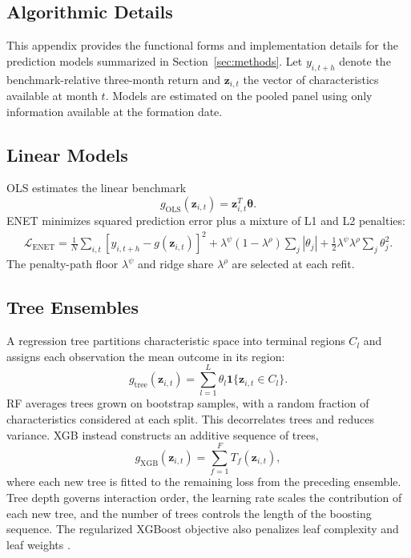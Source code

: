 \documentclass[preprint,12pt,authoryear]{elsarticle}
\begin{document}
\begin{appendices}
\subsection{Algorithmic Details}\label{app:algorithmic}

This appendix provides the functional forms and implementation details for the prediction models summarized in Section~\ref{sec:methods}. Let $y_{i,t+h}$ denote the benchmark-relative three-month return and $\mathbf{z}_{i,t}$ the vector of characteristics available at month $t$. Models are estimated on the pooled panel using only information available at the formation date.

\subsection{Linear Models}

OLS estimates the linear benchmark
\begin{equation}
g_{\mathrm{OLS}}(\mathbf{z}_{i,t})=\mathbf{z}_{i,t}^{T}\boldsymbol{\theta}.
\end{equation}
ENET minimizes squared prediction error plus a mixture of L1 and L2 penalties:
\begin{multline}
\label{elasticeq}
\mathcal{L}_{\mathrm{ENET}}=
\frac{1}{N}\sum_{i,t}\left[y_{i,t+h}-g(\mathbf{z}_{i,t})\right]^2+
\lambda^{\psi}(1-\lambda^{\rho})\sum_j|\theta_j|+
\frac{1}{2}\lambda^{\psi}\lambda^{\rho}\sum_j\theta_j^2.
\end{multline}
The penalty-path floor $\lambda^{\psi}$ and ridge share $\lambda^{\rho}$ are selected at each refit.

\subsection{Tree Ensembles}

A regression tree partitions characteristic space into terminal regions $C_l$ and assigns each observation the mean outcome in its region:
\begin{equation}
g_{\mathrm{tree}}(\mathbf{z}_{i,t})=
\sum_{l=1}^{L}\theta_l\mathbf{1}\{\mathbf{z}_{i,t}\in C_l\}.
\end{equation}
RF averages trees grown on bootstrap samples, with a random fraction of characteristics considered at each split. This decorrelates trees and reduces variance. XGB instead constructs an additive sequence of trees,
\begin{equation}
\label{objxgb}
g_{\mathrm{XGB}}(\mathbf{z}_{i,t})=\sum_{f=1}^{F}T_f(\mathbf{z}_{i,t}),
\end{equation}
where each new tree is fitted to the remaining loss from the preceding ensemble. Tree depth governs interaction order, the learning rate scales the contribution of each new tree, and the number of trees controls the length of the boosting sequence. The regularized XGBoost objective also penalizes leaf complexity and leaf weights \citep{chenguestrin2016}.


\end{appendices}
\end{document}
